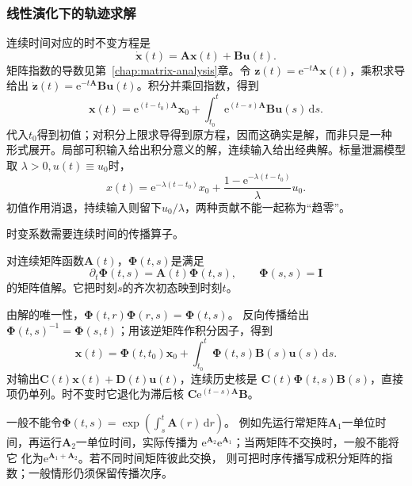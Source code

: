 \subsubsection{线性演化下的轨迹求解}
连续时间对应的时不变方程是
\begin{equation}
  \dot{\bm x}(t)=\bm A\bm x(t)+\bm B\bm u(t).
  \label{eq:dynamical-lti-continuous}
\end{equation}
矩阵指数的导数见第~\ref{chap:matrix-analysis}章。令
$\bm z(t)=\mathrm e^{-t\bm A}\bm x(t)$，乘积求导给出
$\dot{\bm z}(t)=\mathrm e^{-t\bm A}\bm B\bm u(t)$。积分并乘回指数，得到
\begin{equation}
  \bm x(t)=\mathrm e^{(t-t_0)\bm A}\bm x_0+
    \int_{t_0}^t\mathrm e^{(t-s)\bm A}\bm B\bm u(s)\,\mathrm ds.
  \label{eq:dynamical-lti-variation-constants}
\end{equation}
代入$t_0$得到初值；对积分上限求导得到原方程，因而这确实是解，而非只是一种
形式展开。局部可积输入给出积分意义的解，连续输入给出经典解。标量泄漏模型取
$\lambda>0,u(t)\equiv u_0$时，
\[
  x(t)=\mathrm e^{-\lambda(t-t_0)}x_0+
    \frac{1-\mathrm e^{-\lambda(t-t_0)}}{\lambda}u_0.
\]
初值作用消退，持续输入则留下$u_0/\lambda$，两种贡献不能一起称为“趋零”。

时变系数需要连续时间的传播算子。
\begin{definition}[状态转移矩阵]
  \label{def:dynamical-state-transition-matrix}
  对连续矩阵函数$\bm A(t)$，$\bm\Phi(t,s)$是满足
  \begin{equation}
    \partial_t\bm\Phi(t,s)=\bm A(t)\bm\Phi(t,s),\qquad
    \bm\Phi(s,s)=\bm I
    \label{eq:dynamical-state-transition-matrix}
  \end{equation}
  的矩阵值解。它把时刻$s$的齐次初态映到时刻$t$。
\end{definition}
由解的唯一性，$\bm\Phi(t,r)\bm\Phi(r,s)=\bm\Phi(t,s)$。
反向传播给出$\bm\Phi(t,s)^{-1}=\bm\Phi(s,t)$；用该逆矩阵作积分因子，得到
\begin{equation}
  \bm x(t)=\bm\Phi(t,t_0)\bm x_0+
    \int_{t_0}^t\bm\Phi(t,s)\bm B(s)\bm u(s)\,\mathrm ds.
  \label{eq:dynamical-ltv-variation-constants}
\end{equation}
对输出$\bm C(t)\bm x(t)+\bm D(t)\bm u(t)$，连续历史核是
$\bm C(t)\bm\Phi(t,s)\bm B(s)$，直接项仍单列。时不变时它退化为滞后核
$\bm C\mathrm e^{(t-s)\bm A}\bm B$。

一般不能令$\bm\Phi(t,s)=\exp(\int_s^t\bm A(r)\,\mathrm dr)$。
例如先运行常矩阵$\bm A_1$一单位时间，再运行$\bm A_2$一单位时间，实际传播为
$\mathrm e^{\bm A_2}\mathrm e^{\bm A_1}$；当两矩阵不交换时，一般不能将它
化为$\mathrm e^{\bm A_1+\bm A_2}$。若不同时间矩阵彼此交换，
则可把时序传播写成积分矩阵的指数；一般情形仍须保留传播次序。

